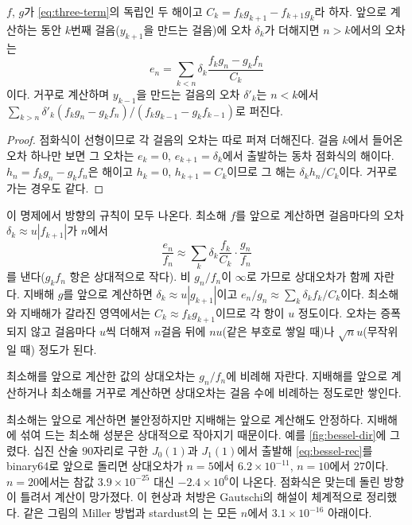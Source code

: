 \begin{proposition}[이산 상수 변화법]
\label{prop:discrete-green}
$f$, $g$가 \cref{eq:three-term}의 독립인 두 해이고 $C_k=f_kg_{k+1}-f_{k+1}g_k$라 하자. 앞으로 계산하는 동안 $k$번째 걸음($y_{k+1}$을 만드는 걸음)에 오차 $\delta_k$가 더해지면 $n>k$에서의 오차는
\[
e_n=\sum_{k<n}\delta_k\frac{f_kg_n-g_kf_n}{C_k}
\]
이다. 거꾸로 계산하며 $y_{k-1}$을 만드는 걸음의 오차 $\delta'_k$는 $n<k$에서 $\sum_{k>n}\delta'_k(f_kg_n-g_kf_n)/(f_kg_{k-1}-g_kf_{k-1})$로 퍼진다.
\end{proposition}

\begin{proof}
점화식이 선형이므로 각 걸음의 오차는 따로 퍼져 더해진다. 걸음 $k$에서 들어온 오차 하나만 보면 그 오차는 $e_k=0$, $e_{k+1}=\delta_k$에서 출발하는 동차 점화식의 해이다. $h_n=f_kg_n-g_kf_n$은 해이고 $h_k=0$, $h_{k+1}=C_k$이므로 그 해는 $\delta_kh_n/C_k$이다. 거꾸로 가는 경우도 같다.
\end{proof}

이 명제에서 방향의 규칙이 모두 나온다. 최소해 $f$를 앞으로 계산하면 걸음마다의 오차 $\delta_k\approx u|f_{k+1}|$가 $n$에서
\[
\frac{e_n}{f_n}\approx\sum_k\delta_k\frac{f_k}{C_k}\cdot\frac{g_n}{f_n}
\]
를 낸다($g_kf_n$ 항은 상대적으로 작다). 비 $g_n/f_n$이 $\infty$로 가므로 상대오차가 함께 자란다. 지배해 $g$를 앞으로 계산하면 $\delta_k\approx u|g_{k+1}|$이고 $e_n/g_n\approx\sum_k\delta_kf_k/C_k$이다. 최소해와 지배해가 갈라진 영역에서는 $C_k\approx f_kg_{k+1}$이므로 각 항이 $u$ 정도이다. 오차는 증폭되지 않고 걸음마다 $u$씩 더해져 $n$걸음 뒤에 $nu$(같은 부호로 쌓일 때)나 $\sqrt nu$(무작위일 때) 정도가 된다.

\begin{corollary}
\label{prop:forward-error}
최소해를 앞으로 계산한 값의 상대오차는 $g_n/f_n$에 비례해 자란다. 지배해를 앞으로 계산하거나 최소해를 거꾸로 계산하면 상대오차는 걸음 수에 비례하는 정도로만 쌓인다.
\end{corollary}

최소해는 앞으로 계산하면 불안정하지만 지배해는 앞으로 계산해도 안정하다. 지배해에 섞여 드는 최소해 성분은 상대적으로 작아지기 때문이다. 예를 \cref{fig:bessel-dir}에 그렸다. 십진 산술 $90$자리로 구한 $J_0(1)$과 $J_1(1)$에서 출발해 \cref{eq:bessel-rec}를 binary64로 앞으로 돌리면 상대오차가 $n=5$에서 $6.2\times10^{-11}$, $n=10$에서 $27$이다. $n=20$에서는 참값 $3.9\times10^{-25}$ 대신 $-2.4\times10^6$이 나온다. 점화식은 맞는데 돌린 방향이 틀려서 계산이 망가졌다. 이 현상과 처방은 Gautschi의 해설\cite{gautschi1967recurrence}이 체계적으로 정리했다. 같은 그림의 Miller 방법과 stardust의 는 모든 $n$에서 $3.1\times10^{-16}$ 아래이다.

